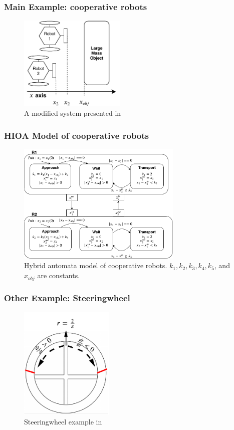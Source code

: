 \begin{frame}[c] \frametitle{ Main Example: cooperative robots }
	\begin{figure}
		\includegraphics[width=0.45\textwidth]{./fig/diagrams/robots_diagram.pdf}
		\caption{A modified system presented in }
	\end{figure}
\end{frame}

\begin{frame}[c] \frametitle{ HIOA Model of cooperative robots }
	\begin{figure}
		\includegraphics[width=0.7\textwidth]{./fig/diagrams/robots_ha.pdf}
		\caption{Hybrid automata model of cooperative robots. $k_1, k_2, k_3, k_4, k_5$, and $x_{obj}$ are constants. }
	\end{figure}
\end{frame}

\begin{frame}[c] \frametitle{ Other Example: Steeringwheel }
	\begin{figure}
		\centering
		\includegraphics[width=0.4\textwidth]{./fig/diagrams/steeringwheel.pdf}
		\caption{Steeringwheel example in }
	\end{figure}
\end{frame}

